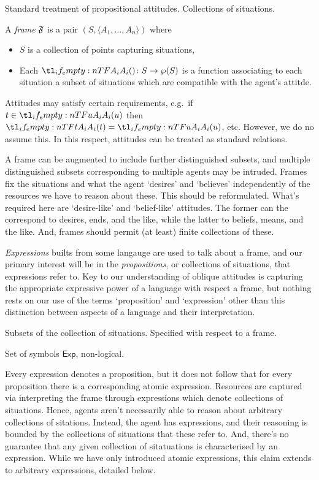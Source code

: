 \documentclass[10pt]{article}
\begin{document}
Standard treatment of propositional attitudes.
Collections of situations.

\begin{definition}[Frame]
  A \emph{frame} \(\mathfrak{F}\) is a pair \((S,\langle A_{1},\dots,A_{n} \rangle)\) where
  \begin{itemize}
  \item \(S\) is a collection of points capturing situations,
  \item Each \(\fatt{} \colon S \to \wp(S)\) is a function associating to each situation a subset of situations which are compatible with the agent's attitde.
  \end{itemize}
  Attitudes may satisfy certain requirements, e.g.\ if \(t \in \fatt{u}\) then \(\fatt{t} = \fatt{u}\), etc.
  However, we do no assume this.
  In this respect, attitudes can be treated as standard relations.
\end{definition}
A frame can be augmented to include further distinguished subsets, and multiple distinguished subsets corresponding to multiple agents may be intruded.
Frames fix the situations and what the agent `desires' and `believes' independently of the resources we have to reason about these.
{\color{red} This should be reformulated.
  What's required here are `desire-like' and `belief-like' attitudes.
  The former can the correspond to desires, ends, and the like, while the latter to beliefs, means, and the like.
  And, frames should permit (at least) finite collections of these.}

\emph{Expressions} builts from some langauge are used to talk about a frame, and our primary interest will be in the \emph{propositions}, or collections of situations, that expressions refer to.
Key to our understanding of oblique attitudes is capturing the appropriate expressive power of a language with respect a frame, but nothing rests on our use of the terms `proposition' and `expression' other than this distinction between aspects of a language and their interpretation.

\begin{definition}[Propositions]
  Subsets of the collection of situations.
  Specified with respect to a frame.
\end{definition}

\begin{definition}
  Set of symbols \(\mathsf{Exp}\), non-logical.
\end{definition}

Every expression denotes a proposition, but it does not follow that for every proposition there is a corresponding atomic expression.
Resources are captured via interpreting the frame through expressions which denote collections of situations.
Hence, agents aren't necessarily able to reason about arbitrary collections of sitations.
Instead, the agent has expressions, and their reasoning is bounded by the collections of situations that these refer to.
And, there's no guarantee that any given collection of sitatuations is characterised by an expression.
While we have only introduced atomic expressions, this claim extends to arbitrary expressions, detailed below.
\end{document}
